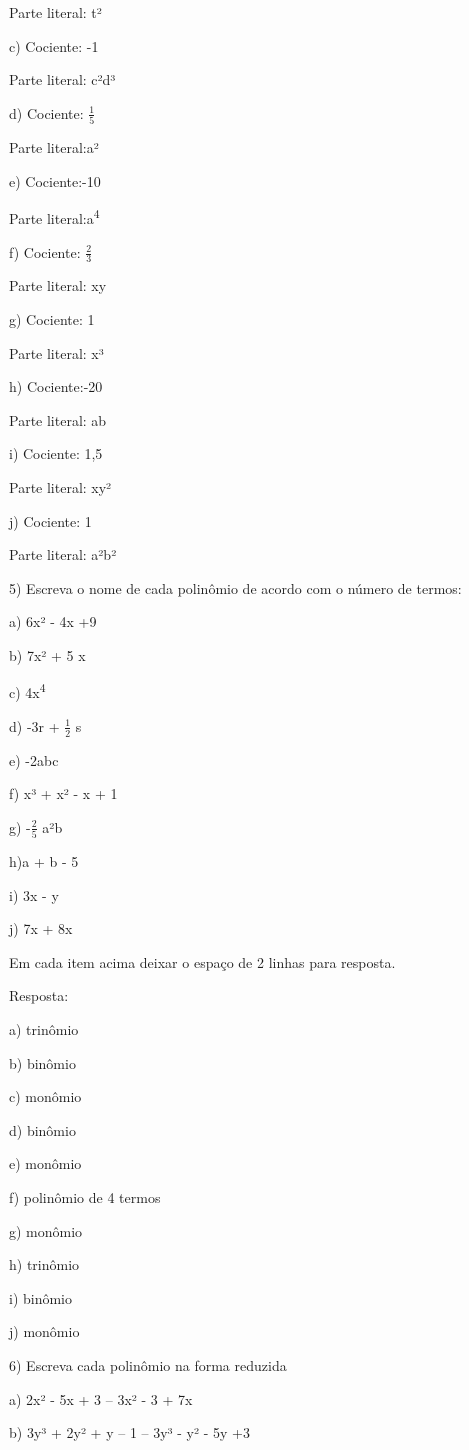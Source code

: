 {Parte literal: t²

c) Cociente: -1

Parte literal: c²d³

d) Cociente: \(\frac{1}{5}\)

Parte literal:a²

e) Cociente:-10

Parte literal:a\textsuperscript{4}

f) Cociente: \(\frac{2}{3}\)

Parte literal: xy

g) Cociente: 1

Parte literal: x³

h) Cociente:-20

Parte literal: ab

i) Cociente: 1,5

Parte literal: xy²

j) Cociente: 1

Parte literal: a²b²

5) Escreva o nome de cada polinômio de acordo com o número de termos:

a) 6x² - 4x +9

b) 7x² + 5 x

c) 4x\textsuperscript{4}

d) -3r + \(\frac{1}{2}\) s

e) -2abc

f) x³ + x² - x + 1

g) -\(\frac{2}{5}\) a²b

h)a + b - 5

i) 3x - y

j) 7x + 8x

Em cada item acima deixar o espaço de 2 linhas para resposta.

Resposta:

a) trinômio

b) binômio

c) monômio

d) binômio

e) monômio

f) polinômio de 4 termos

g) monômio

h) trinômio

i) binômio

j) monômio

6) Escreva cada polinômio na forma reduzida

a) 2x² - 5x + 3 -- 3x² - 3 + 7x

b) 3y³ + 2y² + y -- 1 -- 3y³ - y² - 5y +3

}
